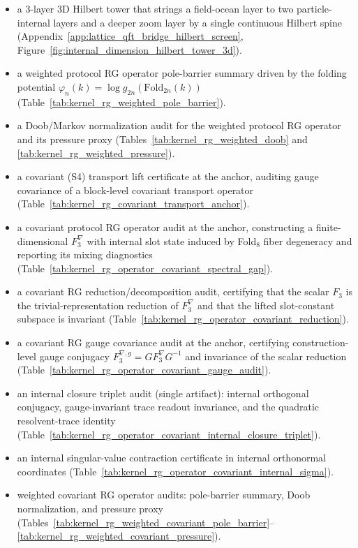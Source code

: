 \begin{itemize}
\item \AuditTag a 3-layer 3D Hilbert tower that strings a field-ocean layer to two particle-internal layers and a deeper zoom layer by a single continuous Hilbert spine (Appendix~\ref{app:lattice_qft_bridge_hilbert_screen}, Figure~\ref{fig:internal_dimension_hilbert_tower_3d}).
\item a weighted protocol RG operator pole-barrier summary driven by the folding potential $\varphi_n(k)=\log g_{2n}(\mathrm{Fold}_{2n}(k))$ (Table~\ref{tab:kernel_rg_weighted_pole_barrier}).
\item a Doob/Markov normalization audit for the weighted protocol RG operator and its pressure proxy (Tables~\ref{tab:kernel_rg_weighted_doob} and \ref{tab:kernel_rg_weighted_pressure}).
\item a covariant (S4) transport lift certificate at the anchor, auditing gauge covariance of a block-level covariant transport operator (Table~\ref{tab:kernel_rg_covariant_transport_anchor}).
\item a covariant protocol RG operator audit at the anchor, constructing a finite-dimensional $F_3^\nabla$ with internal slot state induced by Fold$_8$ fiber degeneracy and reporting its mixing diagnostics (Table~\ref{tab:kernel_rg_operator_covariant_spectral_gap}).
\item a covariant RG reduction/decomposition audit, certifying that the scalar $F_3$ is the trivial-representation reduction of $F_3^\nabla$ and that the lifted slot-constant subspace is invariant (Table~\ref{tab:kernel_rg_operator_covariant_reduction}).
\item a covariant RG gauge covariance audit at the anchor, certifying construction-level gauge conjugacy $F_3^{\nabla,g}=G F_3^\nabla G^{-1}$ and invariance of the scalar reduction (Table~\ref{tab:kernel_rg_operator_covariant_gauge_audit}).
\item an internal closure triplet audit (single artifact): internal orthogonal conjugacy, gauge-invariant trace readout invariance, and the quadratic resolvent-trace identity (Table~\ref{tab:kernel_rg_operator_covariant_internal_closure_triplet}).
\item an internal singular-value contraction certificate in internal orthonormal coordinates (Table~\ref{tab:kernel_rg_operator_covariant_internal_sigma}).
\item weighted covariant RG operator audits: pole-barrier summary, Doob normalization, and pressure proxy (Tables~\ref{tab:kernel_rg_weighted_covariant_pole_barrier}--\ref{tab:kernel_rg_weighted_covariant_pressure}).

\end{itemize}
